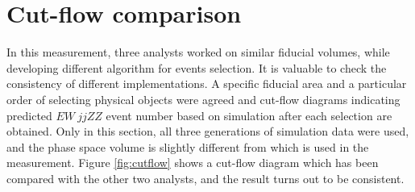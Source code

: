 \documentclass[12pt]{article}
\begin{document}
    \section{Cut-flow comparison}
        \par In this measurement, three analysts worked on similar fiducial volumes, while developing different algorithm for events selection. 
        It is valuable to check the consistency of different implementations. A specific fiducial area and a particular order of selecting 
        physical objects were agreed and cut-flow diagrams indicating predicted $EW\ jjZZ$ event number based on simulation after 
        each selection are obtained. Only in this section, all three generations of simulation data were used, and the phase space volume 
        is slightly different from which is used in the measurement. Figure \ref{fig:cutflow} shows a cut-flow diagram which has been 
        compared with the other two analysts, and the result turns out to be consistent.
        
\end{document}

